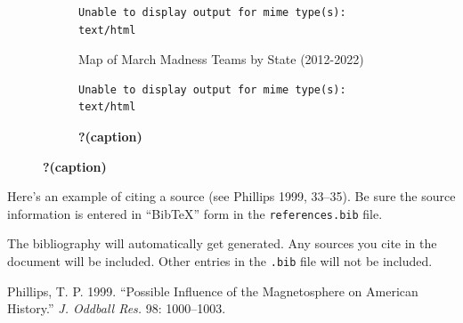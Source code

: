 \documentclass[
  letterpaper,
  DIV=11,
  numbers=noendperiod]{scrartcl}
\newlength{\cslhangindent}
\newlength{\cslentryspacingunit} %
\newenvironment{CSLReferences}[2] %
 {%
  \setlength{\parindent}{0pt}
  \ifodd #1
  \let\oldpar\par
  \def\par{\hangindent=\cslhangindent\oldpar}
  \fi
  \setlength{\parskip}{#2\cslentryspacingunit}
 }%
 {}
\begin{document}
\begin{figure}
{\begin{figure}

{\centering 

\begin{verbatim}
Unable to display output for mime type(s): text/html
\end{verbatim}

}

\caption{Map of March Madness Teams by State (2012-2022)}

\end{figure}

\begin{figure}

{\centering 

\begin{verbatim}
Unable to display output for mime type(s): text/html
\end{verbatim}

}

\caption{\textbf{?(caption)}}

\end{figure}

}

\caption{\label{fig-map}\textbf{?(caption)}}

\end{figure}

Here's an example of citing a source (see Phillips 1999, 33--35). Be
sure the source information is entered in ``BibTeX'' form in the
\texttt{references.bib} file.

The bibliography will automatically get generated. Any sources you cite
in the document will be included. Other entries in the \texttt{.bib}
file will not be included.

\hypertarget{refs}{}
\begin{CSLReferences}{1}{0}
\leavevmode{}%
Phillips, T. P. 1999. {``Possible Influence of the Magnetosphere on
{American} History.''} \emph{J. Oddball Res.} 98: 1000--1003.

\end{CSLReferences}
\end{document}
